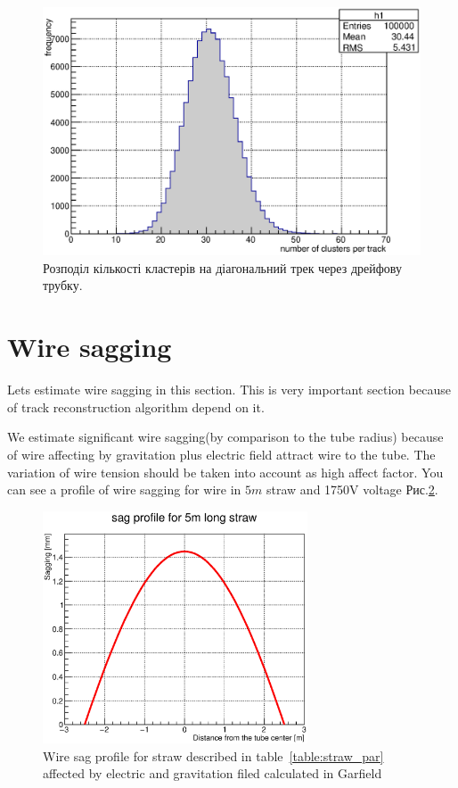 \documentclass[]{article}
\begin{document}
	 \begin{figure}[h]
	 \includegraphics[width=\textwidth]{cluster_distrib}
	 \caption{ Розподіл кількості кластерів на діагональний трек через дрейфову трубку.}
	 \label{fig:n_cluster_distr}
	 \end{figure} 
		 


	
	
	\section{ Wire sagging}
	Lets estimate wire sagging in this section. This is very important section because of track reconstruction algorithm depend on it.
	
	We estimate significant wire sagging(by comparison to the tube radius) because of wire affecting by gravitation plus electric field attract wire to the tube.
	The variation of wire tension should be taken into account as high affect factor. You can see a profile of wire sagging for wire in $5m$ straw and 1750V voltage Рис.\ref{fig:sagProfile}.
	
	\begin{figure}[h!]
	\centering
	\includegraphics[width=0.7\textwidth]{sagProfileFit.eps}
	\caption{Wire sag profile for straw described in table~\ref{table:straw_par} affected by electric and gravitation filed calculated in Garfield }
	
	\label{fig:sagProfile}
	\end{figure}	
	
\end{document}
